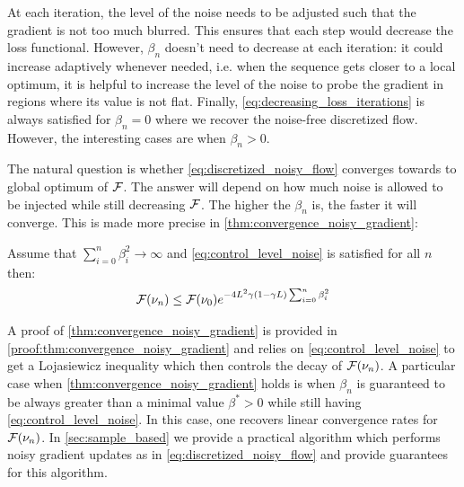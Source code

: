 \begin{remark}
	At each iteration, the level of the noise needs to be adjusted such that the gradient is not too much blurred. This ensures that each step would decrease the loss functional. However, $\beta_n$ doesn't need to decrease at each iteration: it could increase adaptively whenever needed, i.e. when  the sequence gets closer to a local optimum, it is helpful to increase the level of the noise to probe the gradient in regions where its value is not flat.
	Finally, \cref{eq:decreasing_loss_iterations} is always satisfied for $\beta_n = 0$ where we recover the noise-free discretized flow. However, the interesting cases are when $\beta_n>0$.
 \end{remark}
The natural question is whether \cref{eq:discretized_noisy_flow} converges towards to global optimum of ${{\mathcal F}}$. The answer will depend on how much noise is allowed to be injected while still decreasing ${{\mathcal F}}$. The higher the $\beta_n$ is, the faster it will converge. This is made more precise in \cref{thm:convergence_noisy_gradient}: 
 \begin{theorem}\label{thm:convergence_noisy_gradient}
 Assume that $\sum_{i=0}^n \beta_i^2 \rightarrow \infty $ and \cref{eq:control_level_noise} is satisfied for all $n$ then:
 \begin{align}
 	{{\mathcal F}}(\nu_n)\leq {{\mathcal F}}(\nu_0) e^{-4L^2\gamma(1-\gamma L)\sum_{i=0}^n \beta^2_i}
 \end{align}
 \end{theorem}
 A proof of \cref{thm:convergence_noisy_gradient} is provided in \cref{proof:thm:convergence_noisy_gradient} and relies on \cref{eq:control_level_noise} to get a Lojasiewicz inequality which then controls the decay of ${{\mathcal F}}(\nu_n)$. A particular case when \cref{thm:convergence_noisy_gradient} holds is when $\beta_n$ is guaranteed to be always greater than a minimal value $\beta^*>0$ while still having \cref{eq:control_level_noise}. In this case, one recovers linear convergence rates for ${{\mathcal F}}(\nu_n)$.
In \cref{sec:sample_based} we provide a practical algorithm which performs noisy gradient updates as in \cref{eq:discretized_noisy_flow} and provide guarantees for this algorithm.
 
 
 
